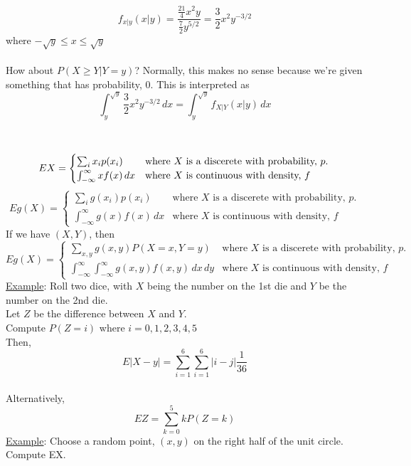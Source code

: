     $$
      f_{x|y}(x|y) = \frac{\frac{21}{4}x^2y}{\frac{7}{2}y^{5/2}} = \frac{3}{2}
        x^2y^{-3/2}
    $$
    where $-\sqrt{y} \le x \le \sqrt{y}$\\\\
    How about $P(X \ge Y | Y = y)$? Normally, this makes no sense because
    we're given something that has probability, 0. This is interpreted as
    $$
      \int_y^{\sqrt{y}} \frac{3}{2}x^2y^{-3/2}\,dx = \int_y^{\sqrt{y}} f_{X|Y}
      (x|y)\,dx
    $$\\\\
  $$
    EX = \begin{cases} \sum_i x_i p(x_i) & \text{where $X$ is a discerete with probability, $p$}.\\ \int_{-\infty}^{\infty}xf(x)\,dx & \text{where $X$ is continuous with density, $f$}\end{cases}\\
  $$
  $$
    Eg(X) = \begin{cases} \sum_i g(x_i) p(x_i) & \text{where $X$ is a discerete with probability, $p$}.\\ \int_{-\infty}^{\infty} g(x)f(x)\,dx & \text{where $X$ is continuous with density, $f$}\end{cases}
  $$
  If we have $(X,Y)$, then
  $$
    Eg(X) = \begin{cases} \sum_{x,y} g(x,y) P(X=x, Y=y) & \text{where $X$ is a discerete with probability, $p$}.\\ \int_{-\infty}^{\infty}\int_{-\infty}^{\infty} g(x,y)f(x,y)\,dx\,dy & \text{where $X$ is continuous with density, $f$}\end{cases}
  $$
  \underline{Example}: Roll two dice, with $X$ being the number on the 1st die
    and $Y$ be the number on the 2nd die.\\
    Let $Z$ be the difference between $X$ and $Y$.\\
    Compute $P(Z = i)$ where $i = 0, 1, 2, 3, 4, 5$\\
    Then, $$
      E|X - y| = \sum_{i = 1}^6 \sum_{i = 1}^6 |i - j| \frac{1}{36}
    $$\\
    Alternatively,
    $$
      EZ = \sum_{k = 0}^5 kP(Z = k)
    $$
    \underline{Example}: Choose a random point, $(x,y)$ on the right half of 
    the unit circle. Compute EX.\\

